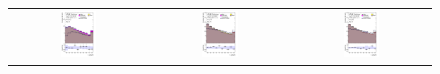 \documentclass[PAPER, coverpage, atlasdraft=true, texlive=2016, UKenglish]{\ATLASLATEXPATH atlasdoc}
\begin{document}
%
\begin{figure}[H]
\centering
\begin{tabular}{@{}ccc@{}}
\includegraphics[page=1,width=0.28\textwidth]{figures/new_pt/log_or_nolog/tuH_reg1l2tau1bnj_os_log_.pdf} &
\includegraphics[page=1,width=0.28\textwidth]{figures/new_pt/log_or_nolog/tuH_reg1l1tau1b1j_ss_log_.pdf}&
\includegraphics[page=1,width=0.28\textwidth]{figures/new_pt/log_or_nolog/tuH_reg1l1tau1b2j_ss_log_.pdf}\\

\end{tabular}
\end{figure}
\end{document}
